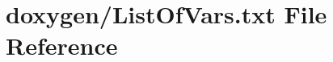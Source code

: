 \hypertarget{ListOfVars_8txt}{\section{doxygen/\+List\+Of\+Vars.txt File Reference}
\label{ListOfVars_8txt}
}

